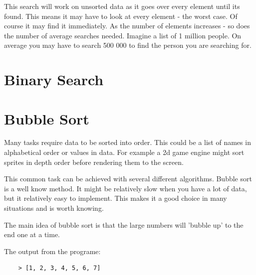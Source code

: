 \documentclass[12pt,a4paper, pink]{bbe}
\begin{document}
	
 \vspace{5mm}
 
    This search will work on unsorted data as it goes over every element until its found. This means it may have to look at every element - the worst case. Of course it may find it immediately.
    As the number of elements increases - so does the number of average searches needed.
    Imagine a list of 1 million people. On average you may have to search 500 000 to find the person you are searching for.
    
    
    
		
	\section{Binary Search}
	
	
		
	\section{Bubble Sort}
	
	Many tasks require data to be sorted into order. This could be a list of names in alphabetical order or values in data. For example a 2d game engine might sort sprites in depth order before rendering them to the screen.
	
	This common task can be achieved with several different algorithms. Bubble sort is a well know method. It might be relatively slow when you have a lot of data, but it relatively easy to implement. This makes it a good choice in many situations and is worth knowing.
	
	The main idea of bubble sort is that the large numbers will 'bubble up' to the end one at a time.
	\vspace{1cm}
	
	
    The output from the programe:
	
	\begin{lstlisting}
    > [1, 2, 3, 4, 5, 6, 7]\end{lstlisting}
   \vspace{1cm}
   
  
   
 
   
\end{document}
